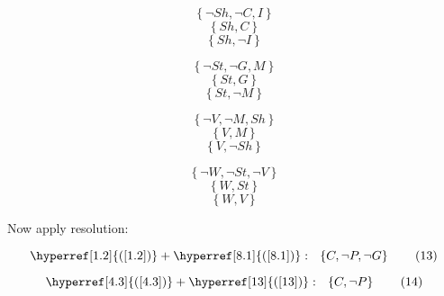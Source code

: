 \documentclass[a4paper]{article}
\newcommand{\refequation}[1]{\hyperref[#1]{(\ref{#1})}}
\begin{document}
\begin{equation}
 \left\{ \lnot Sh , \lnot C , I \right\} \tag{9.1} \label{9.1}
\end{equation}
\begin{equation}
\left\{ Sh , C \right\} \tag{9.2} \label{9.2}
\end{equation}
\begin{equation}
\left\{ Sh , \lnot I \right\} \tag{9.3} \label{9.3}
\end{equation}

\begin{equation}
 \left\{ \lnot St , \lnot G , M \right\} \tag{10.1} \label{10.1}
\end{equation}
\begin{equation}
\left\{ St , G \right\} \tag{10.2} \label{10.2}
\end{equation}
\begin{equation}
\left\{ St , \lnot M \right\} \tag{10.3} \label{10.3}
\end{equation}

\begin{equation}
 \left\{ \lnot V , \lnot M , Sh \right\} \tag{11.1} \label{11.1}
\end{equation}
\begin{equation}
\left\{ V , M \right\} \tag{11.2} \label{11.2}
\end{equation}
\begin{equation}
\left\{ V , \lnot Sh \right\} \tag{11.3} \label{11.3}
\end{equation}

\begin{equation}
 \left\{ \lnot W , \lnot St , \lnot V \right\} \tag{12.1} \label{12.1}
\end{equation}
\begin{equation}
\left\{ W , St \right\} \tag{12.2} \label{12.2}
\end{equation}
\begin{equation}
\left\{ W , V \right\} \tag{12.3} \label{12.3}
\end{equation}

Now apply resolution:

\begin{equation}
\refequation{1.2} + \refequation{8.1}: \  \ \left\{ C , \lnot P , \lnot G \right\} \tag{13} \label{13}
\end{equation}

\begin{equation}
\refequation{4.3} + \refequation{13}: \  \ \left\{ C , \lnot P \right\} \tag{14} \label{14}
\end{equation}
\end{document}
